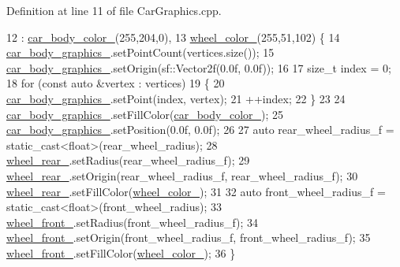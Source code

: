 Definition at line 11 of file Car\+Graphics.\+cpp.


\begin{DoxyCode}
12                                                                               : 
      \hyperlink{classCarGraphics_a3df8d600a272817a5c521cdc8c23c587}{car\_body\_color\_}(255,204,0),
13                                                                                 
      \hyperlink{classCarGraphics_adc369f5f948025767d40f2ad40e2568a}{wheel\_color\_}(255,51,102) \{
14     \hyperlink{classCarGraphics_a4e1969ef5f4326f10b83b1488484f660}{car\_body\_graphics\_}.setPointCount(vertices.size());
15     \hyperlink{classCarGraphics_a4e1969ef5f4326f10b83b1488484f660}{car\_body\_graphics\_}.setOrigin(sf::Vector2f(0.0f, 0.0f));
16 
17     \textcolor{keywordtype}{size\_t} index = 0;
18     \textcolor{keywordflow}{for} (\textcolor{keyword}{const} \textcolor{keyword}{auto} &vertex : vertices)
19     \{
20         \hyperlink{classCarGraphics_a4e1969ef5f4326f10b83b1488484f660}{car\_body\_graphics\_}.setPoint(index, vertex);
21         ++index;
22     \}
23 
24     \hyperlink{classCarGraphics_a4e1969ef5f4326f10b83b1488484f660}{car\_body\_graphics\_}.setFillColor(\hyperlink{classCarGraphics_a3df8d600a272817a5c521cdc8c23c587}{car\_body\_color\_});
25     \hyperlink{classCarGraphics_a4e1969ef5f4326f10b83b1488484f660}{car\_body\_graphics\_}.setPosition(0.0f, 0.0f);
26 
27     \textcolor{keyword}{auto} rear\_wheel\_radius\_f = \textcolor{keyword}{static\_cast<}\textcolor{keywordtype}{float}\textcolor{keyword}{>}(rear\_wheel\_radius);
28     \hyperlink{classCarGraphics_a2a66d0c60b79f54a807a31afd76c4ad1}{wheel\_rear\_}.setRadius(rear\_wheel\_radius\_f);
29     \hyperlink{classCarGraphics_a2a66d0c60b79f54a807a31afd76c4ad1}{wheel\_rear\_}.setOrigin(rear\_wheel\_radius\_f, rear\_wheel\_radius\_f);
30     \hyperlink{classCarGraphics_a2a66d0c60b79f54a807a31afd76c4ad1}{wheel\_rear\_}.setFillColor(\hyperlink{classCarGraphics_adc369f5f948025767d40f2ad40e2568a}{wheel\_color\_});
31 
32     \textcolor{keyword}{auto} front\_wheel\_radius\_f = \textcolor{keyword}{static\_cast<}\textcolor{keywordtype}{float}\textcolor{keyword}{>}(front\_wheel\_radius);
33     \hyperlink{classCarGraphics_a2e004e7f0288f6ed1352ba9116b4d112}{wheel\_front\_}.setRadius(front\_wheel\_radius\_f);
34     \hyperlink{classCarGraphics_a2e004e7f0288f6ed1352ba9116b4d112}{wheel\_front\_}.setOrigin(front\_wheel\_radius\_f, front\_wheel\_radius\_f);
35     \hyperlink{classCarGraphics_a2e004e7f0288f6ed1352ba9116b4d112}{wheel\_front\_}.setFillColor(\hyperlink{classCarGraphics_adc369f5f948025767d40f2ad40e2568a}{wheel\_color\_});
36 \}
\end{DoxyCode}


